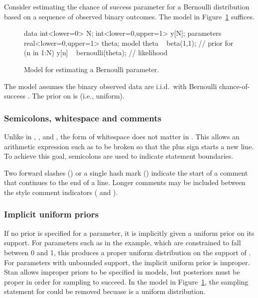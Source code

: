 \documentclass[article]{jss}
\begin{document}
Consider estimating the chance of success parameter for a Bernoulli
distribution based on a sequence of observed binary outcomes.  The
 model in Figure~\ref{bernoulli-model.fig} suffices.
%
\begin{figure}
\begin{Code}
data { 
  int<lower=0> N; 
  int<lower=0,upper=1> y[N];
} 
parameters {
  real<lower=0,upper=1> theta;
} 
model {
  theta ~ beta(1,1);  // prior
  for (n in 1:N) 
    y[n] ~ bernoulli(theta);  // likelihood
}
\end{Code}
\caption{Model for estimating a Bernoulli parameter.}\label{bernoulli-model.fig}
\end{figure}
%
The model assumes the binary observed data  are
i.i.d.\ with Bernoulli chance-of-success .  The prior on
 is  (i.e., uniform).

\subsubsection{Semicolons, whitespace and comments}

Unlike in , , and , the form
of whitespace does not matter in .  This allows an
arithmetic expression such as  to be broken so that the
plus sign starts a new line.  To achieve this goal, semicolons are
used to indicate statement boundaries.

Two forward slashes (\code{//}) or a single hash mark (\code{\#})
indicate the start of a comment that continues to the end of a line.
Longer comments may be included between the  style
comment indicators (\code{/*} and \code{*/}).

\subsubsection{Implicit uniform priors}

If no prior is specified for a parameter, it is implicitly given a
uniform prior on its support.  For parameters such as  in
the example, which are constrained to fall between 0 and 1, this
produces a proper uniform distribution on the support of .
For parameters with unbounded support, the implicit uniform prior is
improper.  Stan allows improper priors to be specified in models, but
posteriors must be proper in order for sampling to succeed.  In the
model in Figure~\ref{bernoulli-model.fig}, the sampling statement for
 could be removed becuase  is
a uniform distribution.
\end{document}
